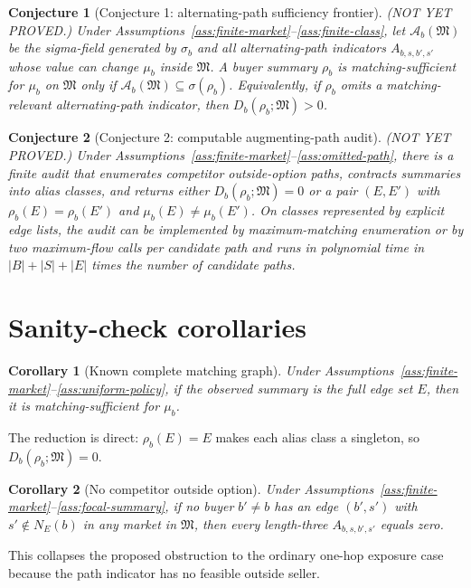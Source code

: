 \documentclass[11pt]{article}
\theoremstyle{definition}
\theoremstyle{plain}
\newtheorem{conjecture}{Conjecture}
\newtheorem{corollary}{Corollary}
\theoremstyle{remark}
\begin{document}
\begin{conjecture}[Conjecture 1: alternating-path sufficiency frontier]\label{conj:path-frontier}
(NOT YET PROVED.) Under Assumptions~\ref{ass:finite-market}--\ref{ass:finite-class}, let $\mathcal A_b(\mathfrak M)$ be the sigma-field generated by $\sigma_b$ and all alternating-path indicators $A_{b,s,b',s'}$ whose value can change $\mu_b$ inside $\mathfrak M$. A buyer summary $\rho_b$ is matching-sufficient for $\mu_b$ on $\mathfrak M$ only if $\mathcal A_b(\mathfrak M)\subseteq\sigma(\rho_b)$. Equivalently, if $\rho_b$ omits a matching-relevant alternating-path indicator, then $D_b(\rho_b;\mathfrak M)>0$.
\end{conjecture}

\begin{conjecture}[Conjecture 2: computable augmenting-path audit]\label{conj:audit}
(NOT YET PROVED.) Under Assumptions~\ref{ass:finite-market}--\ref{ass:omitted-path}, there is a finite audit that enumerates competitor outside-option paths, contracts summaries into alias classes, and returns either $D_b(\rho_b;\mathfrak M)=0$ or a pair $(E,E')$ with $\rho_b(E)=\rho_b(E')$ and $\mu_b(E)\ne\mu_b(E')$. On classes represented by explicit edge lists, the audit can be implemented by maximum-matching enumeration or by two maximum-flow calls per candidate path and runs in polynomial time in $|B|+|S|+|E|$ times the number of candidate paths.
\end{conjecture}

\section{Sanity-check corollaries}
\begin{corollary}[Known complete matching graph]\label{cor:known-graph}
Under Assumptions~\ref{ass:finite-market}--\ref{ass:uniform-policy}, if the observed summary is the full edge set $E$, then it is matching-sufficient for $\mu_b$.
\end{corollary}
The reduction is direct: $\rho_b(E)=E$ makes each alias class a singleton, so $D_b(\rho_b;\mathfrak M)=0$.

\begin{corollary}[No competitor outside option]\label{cor:no-outside}
Under Assumptions~\ref{ass:finite-market}--\ref{ass:focal-summary}, if no buyer $b'\ne b$ has an edge $(b',s')$ with $s'\notin N_E(b)$ in any market in $\mathfrak M$, then every length-three $A_{b,s,b',s'}$ equals zero.
\end{corollary}
This collapses the proposed obstruction to the ordinary one-hop exposure case because the path indicator has no feasible outside seller.
\end{document}

